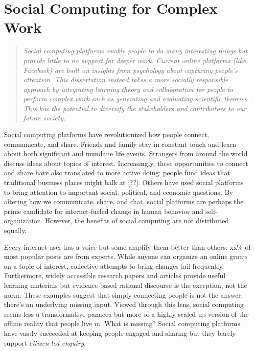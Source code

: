 \chapter{Social Computing for Complex Work}


\begin{quote}
\emph{Social computing platforms enable people to do many interesting things but provide little to no support for deeper work. Current online platforms (like Facebook) are built on insights from psychology about capturing people’s attention. This dissertation instead takes a more socially responsible approach by integrating learning theory and collaboration for people to perform complex work such as generating and evaluating scientific theories. This has the potential to diversify the stakeholders and contributors to our future society.}
\end{quote}
\vspace{0.25in}

Social computing platforms have revolutionized how people connect, communicate, and share. Friends and family stay in constant touch and learn about both significant and mundane life events. Strangers from around the world discuss ideas about topics of interest. Increasingly, these opportunities to connect and share have also translated to more active doing: people fund ideas that traditional business places might balk at [??]. Others have used social platforms to bring attention to important social, political, and economic questions. By altering how we communicate, share, and chat, social platforms are perhaps the prime candidate for internet-fueled change in human behavior and self-organization. However, the benefits of social computing are not distributed equally. 

Every internet user has a voice but some amplify them better than others: xx\% of most popular posts are from experts. While anyone can organize an online group on a topic of interest, collective attempts to bring changes fail frequently. Furthermore, widely accessible research papers and articles provide useful learning materials but evidence-based rational discourse is the exception, not the norm. These examples suggest that simply connecting people is not the answer; there's an underlying missing input. Viewed through this lens, social computing seems less a transformative panacea but more of a highly scaled up version of the offline reality that people live in. What is missing? Social computing platforms have vastly succeeded at keeping people engaged and sharing but they barely support \textit {citizen-led enquiry}.

